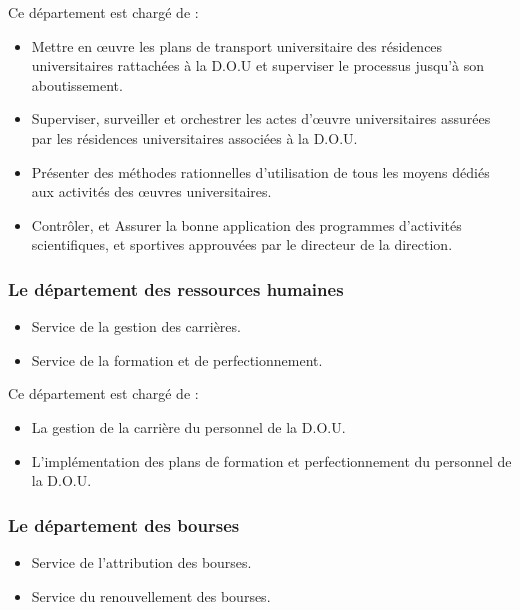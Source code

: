 Ce département est chargé de :
\begin{itemize}\renewcommand{\labelitemi}{$\bullet$}
    \item Mettre en œuvre les plans de transport universitaire des résidences universitaires rattachées à la \acs{D.O.U} et superviser le processus jusqu'à son aboutissement.
    \item Superviser, surveiller et orchestrer les actes d'œuvre universitaires assurées par les résidences universitaires associées à la \acs{D.O.U}.
    \item Présenter des méthodes rationnelles d'utilisation de tous les moyens dédiés aux activités des œuvres universitaires.
    \item Contrôler, et Assurer la bonne application des programmes d'activités scientifiques, et sportives approuvées par le directeur de la direction.\\
\end{itemize}

\subsubsection{Le département des ressources humaines}
\begin{itemize}
    \item Service de la gestion des carrières.
    \item Service de la formation et de perfectionnement.\\
\end{itemize}

Ce département est chargé de :
\begin{itemize}\renewcommand{\labelitemi}{$\bullet$}
    \item La gestion de la carrière du personnel de la \acs{D.O.U}.
    \item L'implémentation des plans de formation et perfectionnement du personnel de la \acs{D.O.U}.
\end{itemize}

\subsubsection{Le département des bourses}
\begin{itemize}
    \item Service de l'attribution des bourses.
    \item Service du renouvellement des bourses.\\
\end{itemize}


